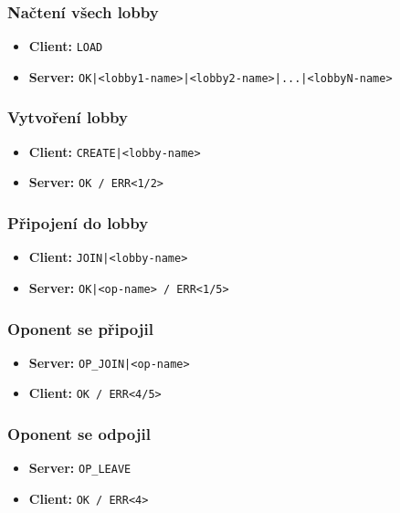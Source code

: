 \documentclass[11pt,a4paper]{article}
\begin{document}
\subsubsection*{Načtení všech lobby}
\begin{itemize}
	\item \textbf{Client:} \texttt{LOAD}
	\item \textbf{Server:} \texttt{OK|<lobby1-name>|<lobby2-name>|...|<lobbyN-name>}
\end{itemize}

\subsubsection*{Vytvoření lobby}
\begin{itemize}
	\item \textbf{Client:} \texttt{CREATE|<lobby-name>}
	\item \textbf{Server:} \texttt{OK / ERR<1/2>}
\end{itemize}

\subsubsection*{Připojení do lobby}
\begin{itemize}
	\item \textbf{Client:} \texttt{JOIN|<lobby-name>}
	\item \textbf{Server:} \texttt{OK|<op-name> / ERR<1/5>}
\end{itemize}

\subsubsection*{Oponent se připojil}
\begin{itemize}
	\item \textbf{Server:} \texttt{OP\_JOIN|<op-name>}
	\item \textbf{Client:} \texttt{OK / ERR<4/5>}
\end{itemize}

\subsubsection*{Oponent se odpojil}
\begin{itemize}
	\item \textbf{Server:} \texttt{OP\_LEAVE}
	\item \textbf{Client:} \texttt{OK / ERR<4>}
\end{itemize}
\end{document}
